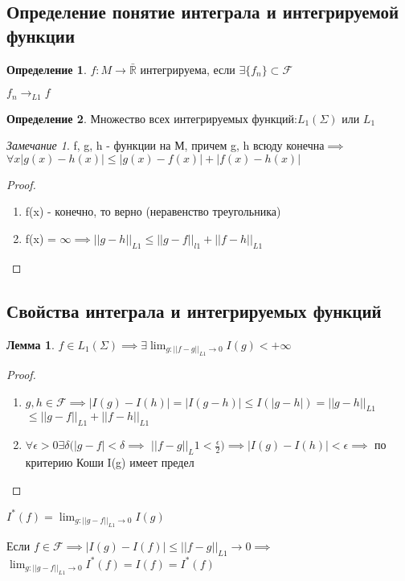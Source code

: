 \documentclass[a4paper]{article}
\newtheorem{lemma}{Лемма}[section]
\theoremstyle{definition}
\newtheorem*{definition}{Определение}
\theoremstyle{remark}
\newtheorem*{remark}{Замечание}
\begin{document}
    \subsection{ Определение понятие интеграла и интегрируемой функции}
    \begin{definition}
     $f: M\to \bar{\mathbb{R} }$ интегрируема, если $\exists \{f_n\}\subset \mathcal{F} $

     $f_n\to_{L1}f$
\end{definition}
\begin{definition}
     Множество всех интегрируемых функций:$L_1(\Sigma)$ или $L_1$
\end{definition}
     \begin{remark}
         f, g, h -  функции на М, причем g, h всюду конечна$\implies$
         $\forall x |g(x) - h(x)|\leq |g(x) - f(x)| +|f(x)- h(x)|$
     \end{remark}
     \begin{proof}
          \begin{enumerate}
               \item f(x) -  конечно, то верно (неравенство треугольника)
               \item f(x) = $\infty\implies ||g-h||_{L1}\leq ||g-f||_{l1}+ ||f-h||_{L1}$
          \end{enumerate}
     \end{proof}
    \subsection{ Свойства интеграла и интегрируемых функций}
    \begin{lemma}
     $f\in L_1(\Sigma)\implies \exists \lim_{g:||f-g||_{L1}\to 0} I(g)< +\infty $
\end{lemma}
\begin{proof}
     \begin{enumerate}
          \item $g, h\in\mathcal{F} \implies |I(g) - I(h)| = |I(g-h)|\leq I(|g-h|) = ||g-h||_{L1}$
          $\leq ||g-f||_{L1} + ||f-h||_{L1}$
          \item $\forall \epsilon >0 \exists \delta (|g-f|< \delta \implies$
          $||f-g||_L1<\frac{\epsilon}{2})\implies |I(g) - I(h)|<\epsilon\implies $ по критерию Коши I(g) имеет предел
     \end{enumerate}
\end{proof}
$I^*(f) = \lim_{g:||g-f||_{L1}\to 0} I(g)$

     Если $f\in\mathcal{F} \implies|I(g) - I(f)|\leq||f-g||_{L1}\to 0\implies$
     $\lim_{g:||g-f||_{L1}\to0} I^*(f) = I(f) = I^*(f)$
\end{document}
